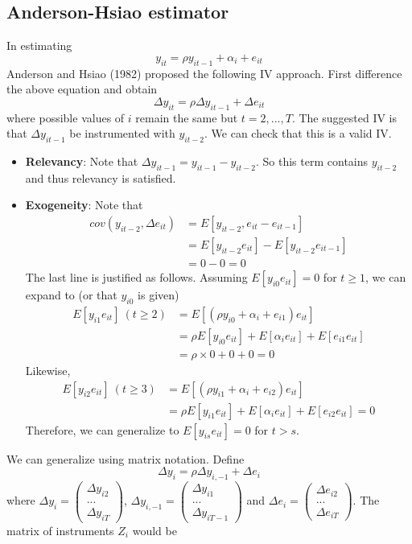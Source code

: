 \documentclass[12pt]{article}
\theoremstyle{definition}
\theoremstyle{property}
\theoremstyle{assumption}
\theoremstyle{example}
\theoremstyle{comment}
\begin{document}
\subsection{Anderson-Hsiao estimator}
In estimating 
\[
y_{it}=\rho y_{it-1}+\alpha_i +e_{it}
\]
Anderson and Hsiao (1982) proposed the following IV approach. First difference the above equation and obtain
\[
\Delta y_{it}=\rho\Delta  y_{it-1} +\Delta e_{it}
\]
where possible values of $i$ remain the same but $t=2,...,T$. The suggested IV is that $\Delta y_{it-1}$ be instrumented with $y_{it-2}$. We can check that this is a valid IV. 
\begin{itemize}
\item \textbf{Relevancy}: Note that $\Delta y_{it-1}= y_{it-1}-y_{it-2}$. So this term contains $y_{it-2}$ and thus relevancy is satisfied.
\item \textbf{Exogeneity}: Note that
\begin{align*}
cov(y_{it-2},\Delta e_{it})&=E[y_{it-2}, e_{it}-e_{it-1}]\\
&=E[y_{it-2}e_{it}]-E[y_{it-2}e_{it-1}]\\
&=0-0=0
\end{align*}
The last line is justified as follows. Assuming $E[y_{i0}e_{it}]=0$ for $t\geq1$, we can expand to (or that $y_{i0}$ is given)
\begin{align*}
E[y_{i1}e_{it}]\ (t\geq 2)&=E[(\rho y_{i0}+\alpha_i +e_{i1})e_{it}]\\
&=\rho E[y_{i0}e_{it}]+E[\alpha_ie_{it}]+E[e_{i1}e_{it}]\\
&=\rho\times0+0+0=0
\end{align*}
Likewise, 
\begin{align*}
E[y_{i2}e_{it}]\ (t\geq 3)&=E[(\rho y_{i1}+\alpha_i +e_{i2})e_{it}]\\
&=\rho E[y_{i1}e_{it}]+E[\alpha_ie_{it}]+E[e_{i2}e_{it}]=0
\end{align*}
Therefore, we can generalize to $E[y_{is}e_{it}]=0$ for $t>s$. 
\end{itemize}
We can generalize using matrix notation. Define
\[
\Delta {y}_i = \rho\Delta{y}_{i,-1}+\Delta {e}_i
\]
where $\Delta {y}_i=\begin{pmatrix} \Delta y_{i2}\\ ...\\ \Delta y_{iT} \end{pmatrix}$, $\Delta {y}_{i,-1}=\begin{pmatrix} \Delta y_{i1}\\ ...\\ \Delta y_{iT-1} \end{pmatrix}$ and $\Delta {e}_i=\begin{pmatrix} \Delta e_{i2}\\ ...\\ \Delta e_{iT} \end{pmatrix}$. The matrix of instruments $Z_i$ would be
\end{document}
